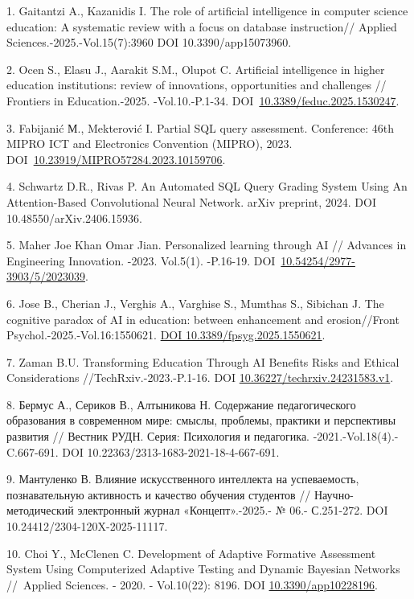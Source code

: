 \begin{refs}
1. Gaitantzi A., Kazanidis I. The role of artificial intelligence in
computer science education: A systematic review with a focus on
database instruction// Applied Sciences.-2025.-Vol.15(7):3960 DOI
10.3390/app15073960.

2. Ocen S., Elasu J., Aarakit S.M., Olupot C. Artificial intelligence in
higher education institutions: review of innovations, opportunities
and challenges // Frontiers in Education.-2025. -Vol.10.-P.1-34.
DOI~\href{https://doi.org/10.3389/feduc.2025.1530247}{10.3389/feduc.2025.1530247}.

3. Fabijanić М., Mekterović I. Partial SQL query assessment. Conference:
46th MIPRO ICT and Electronics Convention (MIPRO), 2023.
DOI~\href{https://doi.org/10.23919/MIPRO57284.2023.10159706}{10.23919/MIPRO57284.2023.10159706}.

4. Schwartz D.R., Rivas P. An Automated SQL Query Grading System Using An
Attention-Based Convolutional Neural Network. arXiv preprint, 2024.
DOI 10.48550/arXiv.2406.15936.

5. Maher Joe Khan Omar Jian. Personalized learning through AI // Advances
in Engineering Innovation. -2023. Vol.5(1). -P.16-19.
DOI~\href{https://doi.org/10.54254/2977-3903/5/2023039}{10.54254/2977-3903/5/2023039}.

6. Jose B., Cherian J., Verghis A., Varghise S., Mumthas S., Sibichan J.
The cognitive paradox of AI in education: between enhancement and
erosion//Front Psychol.-2025.-Vol.16:1550621.
\href{https://doi.org/10.3389/fpsyg.2025.1550621}{DOI
10.3389/fpsyg.2025.1550621}.

7. Zaman B.U. Transforming Education Through AI Benefits Risks and
Ethical Considerations //TechRxiv.-2023.-P.1-16. DOI
\href{https://doi.org/10.36227/techrxiv.24231583.v1}{10.36227/techrxiv.24231583.v1}.

8. Бермус А., Сериков В., Алтыникова Н. Содержание педагогического
образования в современном мире: смыслы, проблемы, практики и
перспективы развития // Вестник РУДН. Серия: Психология и педагогика.
-2021.-Vol.18(4).-C.667-691. DOI 10.22363/2313-1683-2021-18-4-667-691.

9. Мантуленко В. Влияние искусственного интеллекта на успеваемость,
познавательную активность и качество обучения студентов //
Научно-методический электронный журнал «Концепт».-2025.- № 06.-
С.251-272. DOI 10.24412/2304-120X-2025-11117.

10. Choi Y., McClenen C. Development of Adaptive Formative Assessment
System Using Computerized Adaptive Testing and Dynamic Bayesian Networks
//~Applied Sciences. - 2020. - Vol.10(22): 8196. DOI
\href{https://doi.org/10.3390/app10228196}{10.3390/app10228196}.


\end{refs}
